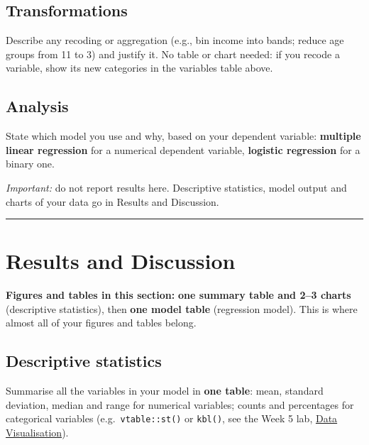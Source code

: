 \documentclass[
  letterpaper,
  DIV=11,
  numbers=noendperiod]{scrreprt}
\begin{document}
\subsection*{Transformations}\label{transformations}

Describe any recoding or aggregation (e.g., bin income into bands;
reduce age groups from 11 to 3) and justify it. No table or chart
needed: if you recode a variable, show its new categories in the
variables table above.

\subsection*{Analysis}\label{analysis}

State which model you use and why, based on your dependent variable:
\textbf{multiple linear regression} for a numerical dependent variable,
\textbf{logistic regression} for a binary one.

\emph{Important:} do not report results here. Descriptive statistics,
model output and charts of your data go in Results and Discussion.

\begin{center}\rule{0.5\linewidth}{0.5pt}\end{center}

\section*{Results and Discussion}\label{results-and-discussion}


\textbf{Figures and tables in this section:} \textbf{one summary table
and 2--3 charts} (descriptive statistics), then \textbf{one model table}
(regression model). This is where almost all of your figures and tables
belong.

\subsection*{Descriptive statistics}\label{descriptive-statistics}

Summarise all the variables in your model in \textbf{one table}: mean,
standard deviation, median and range for numerical variables; counts and
percentages for categorical variables (e.g.~\texttt{vtable::st()} or
\texttt{kbl()}, see the Week 5 lab,
\href{../labs/05.Visualisation.qmd}{Data Visualisation}).
\end{document}
